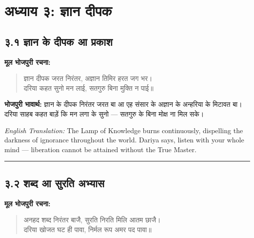 
\cleardoublepage
\section*{अध्याय ३: ज्ञान दीपक}

\subsection*{३.१ ज्ञान के दीपक आ प्रकाश}

\textbf{मूल भोजपुरी रचना:}

\begin{quote}
ज्ञान दीपक जरत निरंतर, अज्ञान तिमिर हरत जग भर।\\
दरिया कहत सुनो मन लाई, सतगुरु बिना मुक्ति न पाई॥
\end{quote}

\textbf{भोजपुरी भावार्थ:} ज्ञान के दीपक निरंतर जरत बा आ एह संसार के अज्ञान के अन्हरिया के मिटावत बा। दरिया साहब कहत बाड़ें कि मन लगा के सुनो — सतगुरु के बिना मोक्ष ना मिल सके।

\begin{sloppypar}
{\engfont \textit{English Translation:} The Lamp of Knowledge burns continuously, dispelling the darkness of ignorance throughout the world.
Dariya says, listen with your whole mind --- liberation cannot be attained without the True Master.}
\end{sloppypar}

\begin{center}
{\color{bordercolor}\rule{0.4\textwidth}{0.4pt}}
\end{center}

\subsection*{३.२ शब्द आ सुरति अभ्यास}

\textbf{मूल भोजपुरी रचना:}

\begin{quote}
अनहद शब्द निरंतर बाजै, सुरति निरति मिलि आतम छाजै।\\
दरिया खोजत घट ही पावा, निर्मल रूप अमर पद पावा॥
\end{quote}

